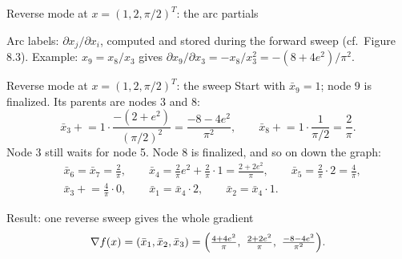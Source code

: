 \documentclass[12pt,aspectratio=169]{beamer}
\newcommand{\xb}{\bar x}
\begin{document}
\begin{frame}{Reverse mode at $x=(1,2,\pi/2)^T$: the arc partials}
  \centering

  \vspace{1ex}
  \raggedright
  Arc labels: $\partial x_j/\partial x_i$, computed and stored during the forward sweep (cf.\ Figure 8.3).
  Example: $x_9=x_8/x_3$ gives $\partial x_9/\partial x_3 = -x_8/x_3^2 = -(8+4e^2)/\pi^2$.
\end{frame}

\begin{frame}{Reverse mode at $x=(1,2,\pi/2)^T$: the sweep}
  Start with $\xb_9=1$; node 9 is finalized. Its parents are nodes 3 and 8:
  \begin{equation}
    \xb_3 \mathrel{+}= 1\cdot\frac{-(2+e^2)}{(\pi/2)^2} = \frac{-8-4e^2}{\pi^2}, \qquad
    \xb_8 \mathrel{+}= 1\cdot\frac{1}{\pi/2} = \frac2\pi. \tag{8.33}
  \end{equation}
  Node 3 still waits for node 5. Node 8 is finalized, and so on down the graph:
  \[
    \begin{aligned}
      &\xb_6=\xb_7=\tfrac2\pi, \qquad
       \xb_4 = \tfrac2\pi e^2+\tfrac2\pi\cdot1 = \tfrac{2+2e^2}{\pi}, \qquad
       \xb_5 = \tfrac2\pi\cdot2=\tfrac4\pi,\\
      &\xb_3 \mathrel{+}= \tfrac4\pi\cdot0, \qquad
       \xb_1 = \xb_4\cdot2, \qquad \xb_2=\xb_4\cdot1.
    \end{aligned}
  \]
  \begin{block}{Result: one reverse sweep gives the whole gradient}
    \vspace{-1ex}
    \[
      \nabla f(x) = (\xb_1,\xb_2,\xb_3) = \Bigl(\tfrac{4+4e^2}{\pi},\ \tfrac{2+2e^2}{\pi},\ \tfrac{-8-4e^2}{\pi^2}\Bigr).
    \]
  \end{block}
\end{frame}
\end{document}
